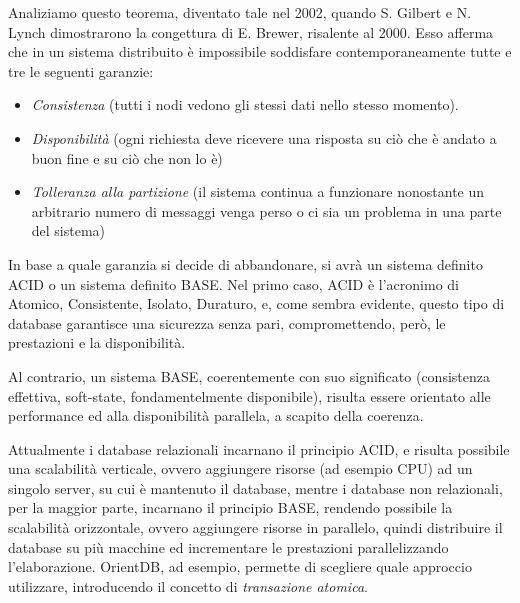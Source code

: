 Analiziamo questo teorema, diventato tale nel 2002, quando S. Gilbert e N. Lynch dimostrarono la congettura di E. Brewer, risalente al 2000. Esso afferma che in un sistema distribuito è impossibile soddisfare contemporaneamente tutte e tre le seguenti garanzie:
\begin{itemize}
\item \emph{Consistenza} (tutti i nodi vedono gli stessi dati nello stesso momento).
\item \emph{Disponibilità} (ogni richiesta deve ricevere una risposta su ciò che è andato a buon fine e su ciò che non lo è)
\item \emph{Tolleranza alla partizione} (il sistema continua a funzionare nonostante un arbitrario numero di messaggi venga perso o ci sia un problema in una parte del sistema)
\end{itemize}

In base a quale garanzia si decide di abbandonare, si avrà un sistema definito ACID o un sistema definito BASE. Nel primo caso, ACID è l'acronimo di Atomico, Consistente, Isolato, Duraturo, e, come sembra evidente, questo tipo di database garantisce una sicurezza senza pari, compromettendo, però, le prestazioni e la disponibilità.

Al contrario, un sistema BASE, coerentemente con suo significato (consistenza effettiva, soft-state, fondamentelmente disponibile), risulta essere orientato alle performance ed alla disponibilità parallela, a scapito della coerenza.

Attualmente i database relazionali incarnano il principio ACID, e risulta possibile una scalabilità verticale, ovvero aggiungere risorse (ad esempio CPU) ad un singolo server, su cui è mantenuto il database, mentre i database non relazionali, per la maggior parte, incarnano il principio BASE, rendendo possibile la scalabilità orizzontale, ovvero aggiungere risorse in parallelo, quindi distribuire il database su più macchine ed incrementare le prestazioni parallelizzando l'elaborazione. OrientDB, ad esempio, permette di scegliere quale approccio utilizzare, introducendo il concetto di \emph{transazione atomica}.

